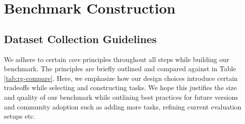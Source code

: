 \documentclass[11pt]{article}
\theoremstyle{plain}
\theoremstyle{definition}
\theoremstyle{remark}
\begin{document}
\section{Benchmark Construction} \label{app:bench-construction}

\subsection{Dataset Collection Guidelines} \label{app:data-collection-guidelines}

We adhere to certain \emph{core} principles throughout all steps while building our benchmark. The principles are briefly outlined and compared against in Table \ref{tab:rg-compare}. Here, we emphasize how our design choices introduce certain tradeoffs while selecting and constructing tasks. We hope this justifies the size and quality of our benchmark while outlining best practices for future versions and community adoption such as adding more tasks, refining current evaluation setups etc. 
\end{document}
